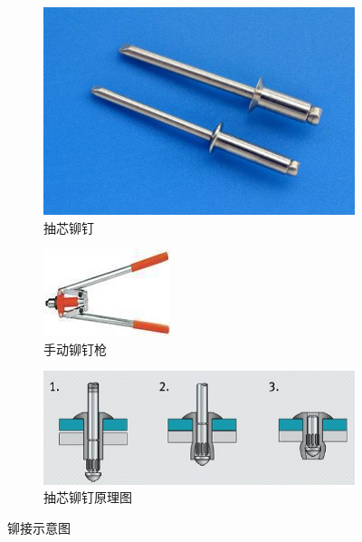 \documentclass[UTF8]{article} %
\begin{document}
\begin{figure}[H]
  \centering
  \begin{subfigure}[b]{0.3\textwidth}
         \centering
         \includegraphics[width=\textwidth]{mao2.png}
          \caption{抽芯铆钉}
  \end{subfigure}
  \quad
  \begin{subfigure}[b]{0.3\textwidth}
          \centering
          \includegraphics[width=\textwidth]{mao3.png}
          \caption{手动铆钉枪}
  \end{subfigure}
  \begin{subfigure}[b]{0.5\textwidth}
    \centering
    \includegraphics[width=\textwidth]{mao4.png}
    \caption{抽芯铆钉原理图}
  \end{subfigure}
  \caption{铆接示意图}
\end{figure}
\end{document}
